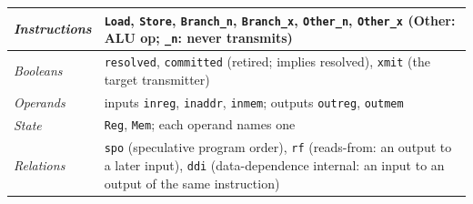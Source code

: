 {%
%
\footnotesize%
%
\def\evgw{46pt}%
\setlength{\tabcolsep}{3pt}%
\def\evmw{\dimexpr252pt-\evgw-4\tabcolsep-3\arrayrulewidth\relax}%
\renewcommand{\arraystretch}{1.2}%
\def\evt#1{\texttt{#1}}%
\begin{tabular}{|>{\raggedright\arraybackslash\itshape}p{\evgw}|>{\raggedright\arraybackslash}p{\evmw}|}%
\hline%
Instructions & \evt{Load}, \evt{Store}, \evt{Branch\_n}, \evt{Branch\_x}, \evt{Other\_n}, \evt{Other\_x} (Other: ALU op; \evt{\_n}: never transmits)\\\hline%
Booleans & \evt{resolved}, \evt{committed} (retired; implies resolved), \textcolor{ssxmitink}{\evt{xmit}} (the target transmitter)\\\hline%
Operands & inputs \evt{inreg}, \evt{inaddr}, \evt{inmem}; outputs \evt{outreg}, \evt{outmem}\\\hline%
State & \evt{Reg}, \evt{Mem}; each operand names one\\\hline%
Relations & \evt{spo} (speculative program order), \evt{rf} (reads-from: an output to a later input), \evt{ddi} (data-dependence internal: an input to an output of the same instruction)\\\hline%
\end{tabular}%
}%
